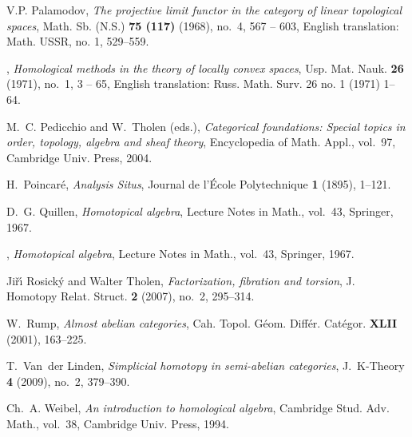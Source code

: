 \documentclass [12pt,oneside]{book}%
\theoremstyle{captionstyle}  %
\begin{document}
\begin{thebibliography}{10}
    V.P. Palamodov, \emph{The projective limit functor in the category of linear
        topological spaces}, Math. Sb. (N.S.) \textbf{75 (117)} (1968), no.~4, 567 --
    603, English translation: Math. USSR, no. 1, 529--559.

    \bysame, \emph{Homological methods in the theory of locally convex spaces},
    Usp. Mat. Nauk. \textbf{26} (1971), no.~1, 3 -- 65, English translation:
    Russ. Math. Surv. 26 no. 1 (1971) 1--64.

    M.~C. Pedicchio and W.~Tholen (eds.), \emph{Categorical foundations: Special
        topics in order, topology, algebra and sheaf theory}, Encyclopedia of Math.
    Appl., vol.~97, Cambridge Univ. Press, 2004.

    H.~Poincar\'e, \emph{{Analysis Situs}}, Journal de l'\'Ecole Polytechnique
    \textbf{1} (1895), 1--121.

    D.~G. Quillen, \emph{Homotopical algebra}, Lecture Notes in Math., vol.~43,
    Springer, 1967.

    \bysame, \emph{Homotopical algebra}, Lecture Notes in Math., vol.~43, Springer,
    1967.

    Ji\v{r}\'{\i} Rosick\'{y} and Walter Tholen, \emph{Factorization, fibration and
        torsion}, J. Homotopy Relat. Struct. \textbf{2} (2007), no.~2, 295--314.

    W.~Rump, \emph{Almost abelian categories}, Cah. Topol. G\'eom. Diff\'er.
    Cat\'egor. \textbf{XLII} (2001), 163--225.

    T.~Van~der Linden, \emph{Simplicial homotopy in semi-abelian categories},
    J.~K-Theory \textbf{4} (2009), no.~2, 379--390.

    Ch.~A. Weibel, \emph{An introduction to homological algebra}, Cambridge Stud.
    Adv. Math., vol.~38, Cambridge Univ. Press, 1994.

\end{thebibliography}

%
%
\cleardoublepage
{}
%
\end{document}
